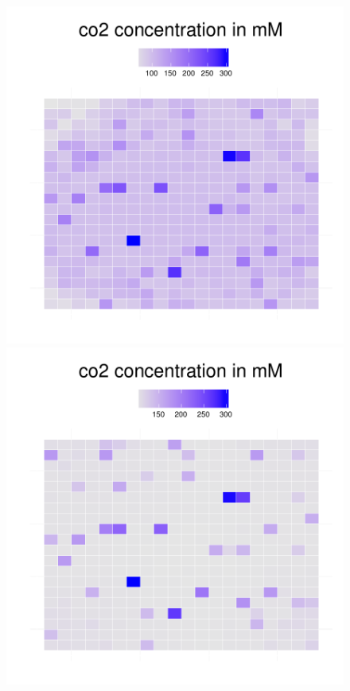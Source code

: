 \begin{figure}[h!]
{\begin{minipage}[t]{0.3\textwidth}
  \end{minipage}
  \begin{minipage}[t]{0.3\textwidth}
    \includegraphics[width=\textwidth]{../results/Bcoli_20x20_seed176_co235.pdf}
  \end{minipage}
  \begin{minipage}[t]{0.3\textwidth}
    \includegraphics[width=\textwidth]{../results/Bcoli_20x20_seed176_co250.pdf}

\end{minipage}}
\end{figure}
